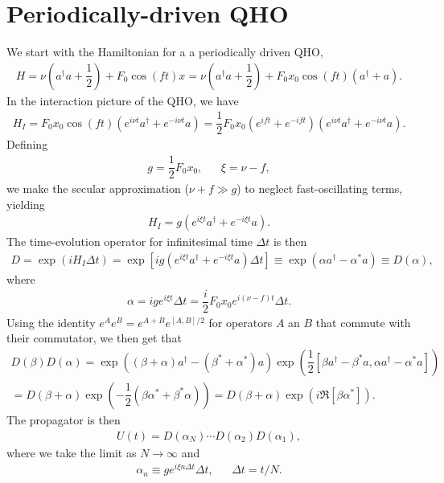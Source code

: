 \documentclass[aps,notitlepage,nofootinbib,10pt]{revtex4-1}
\newcommand{\f}[2]{\dfrac{#1}{#2}} %
\newcommand{\p}[1]{\left(#1\right)} %
\renewcommand{\sp}[1]{\left[#1\right]} %
\newcommand{\1}{\mathds{1}}
\begin{document}
\newpage
\section{Periodically-driven QHO}

We start with the Hamiltonian for a a periodically driven QHO,
\begin{align}
  H
  = \nu\p{a^\dag a + \f12} + F_0\cos\p{ft}x
  = \nu\p{a^\dag a + \f12} + F_0x_0\cos\p{ft}\p{a^\dag + a}.
\end{align}
In the interaction picture of the QHO, we have
\begin{align}
  H_I
  = F_0x_0\cos\p{ft}\p{e^{i\nu t}a^\dag + e^{-i\nu t}a}
  = \f12F_0x_0\p{e^{ift}+e^{-ift}}\p{e^{i\nu t}a^\dag + e^{-i\nu t}a}.
\end{align}
Defining
\begin{align}
  g = \f12 F_0x_0, && \xi = \nu - f,
\end{align}
we make the secular
approximation ($\nu+f\gg g$) to neglect fast-oscillating terms,
yielding
\begin{align}
  H_I = g\p{e^{i\xi t}a^\dag + e^{-i\xi t}a}.
\end{align}
The time-evolution operator for infinitesimal time $\Delta t$ is then
\begin{align}
  D
  = \exp\p{iH_I\Delta t}
  = \exp\sp{ig\p{e^{i\xi t}a^\dag + e^{-i\xi t}a}\Delta t}
  \equiv \exp\p{\alpha a^\dag - \alpha^*a}
  \equiv D\p\alpha,
\end{align}
where
\begin{align}
  \alpha = ige^{i\xi t}\Delta t = \f{i}2F_0x_0e^{i\p{\nu-f}t}\Delta t.
\end{align}
Using the identity $e^Ae^B = e^{A+B}e^{\sp{A,B}/2}$ for operators $A$
an $B$ that commute with their commutator, we then get that
\begin{multline}
  D\p\beta D\p\alpha
  = \exp\p{\p{\beta+\alpha} a^\dag - \p{\beta^*+\alpha^*}a}
  \exp\p{\f12\sp{\beta a^\dag - \beta^*a,
      \alpha a^\dag - \alpha^*a}} \\
  = D\p{\beta+\alpha}
  \exp\p{-\f12\p{\beta\alpha^*+\beta^*\alpha}}
  = D\p{\beta+\alpha}\exp\p{i\Re\sp{\beta\alpha^*}}.
\end{multline}
The propagator is then
\begin{align}
  U\p{t} = D\p{\alpha_N}\cdots D\p{\alpha_2}D\p{\alpha_1},
\end{align}
where we take the limit as $N\to\infty$ and
\begin{align}
  \alpha_n \equiv ge^{i\xi n\Delta t}\Delta t, && \Delta t = t/N.
\end{align}
\end{document}
